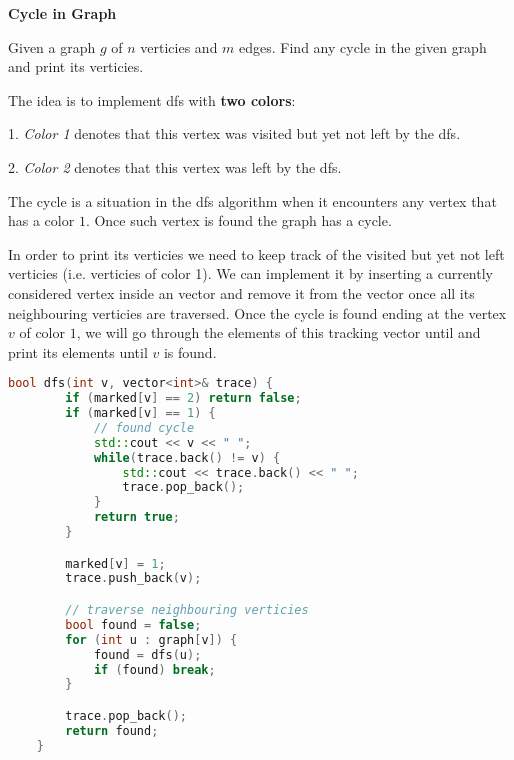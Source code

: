 \begin{problem}\textbf{Cycle in Graph}

    Given a graph $g$ of $n$ verticies and $m$ edges. Find any cycle in the given graph and print its verticies.
\end{problem}


\begin{solution}

    The idea is to implement dfs with \textbf{two colors}:

    1. \textit{Color 1} denotes that this vertex was visited but yet not left by the dfs.

    2. \textit{Color 2} denotes that this vertex was left by the dfs.

    The cycle is a situation in the dfs algorithm when it encounters any vertex that has a color $1$. Once such vertex is found the graph has a cycle.

    In order to print its verticies we need to keep track of the visited but yet not left verticies (i.e. verticies of color 1). We can implement it by inserting a currently considered vertex inside an vector and remove it from the vector once all its neighbouring verticies are traversed. Once the cycle is found ending at the vertex $v$ of color $1$, we will go through the elements of this tracking vector until and print its elements until $v$ is found.

    \begin{lstlisting}[language=C++]
    bool dfs(int v, vector<int>& trace) {
        if (marked[v] == 2) return false;
        if (marked[v] == 1) {
            // found cycle
            std::cout << v << " ";
            while(trace.back() != v) {
                std::cout << trace.back() << " ";
                trace.pop_back();
            }
            return true;
        }

        marked[v] = 1;
        trace.push_back(v);

        // traverse neighbouring verticies
        bool found = false;
        for (int u : graph[v]) {
            found = dfs(u);
            if (found) break;
        }

        trace.pop_back();
        return found;
    }
    \end{lstlisting}

\end{solution}